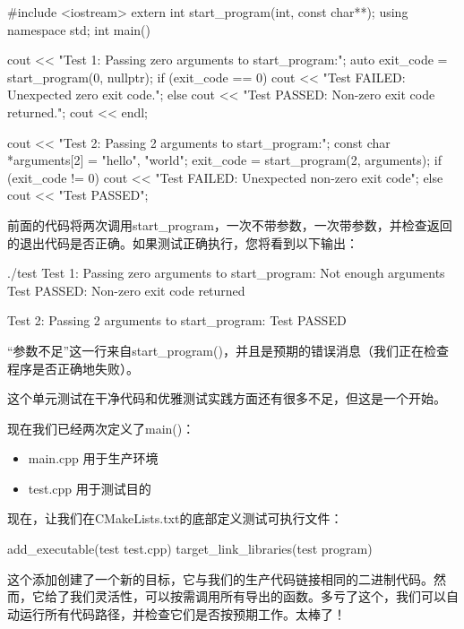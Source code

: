 
\begin{cpp}
#include <iostream>
extern int start_program(int, const char**);
using namespace std;
int main()
{
    cout << "Test 1: Passing zero arguments to start_program:\n";
    auto exit_code = start_program(0, nullptr);
    if (exit_code == 0)
        cout << "Test FAILED: Unexpected zero exit code.\n";
    else
        cout << "Test PASSED: Non-zero exit code returned.\n";
    cout << endl;

    cout << "Test 2: Passing 2 arguments to start_program:\n";
    const char *arguments[2] = {"hello", "world"};
    exit_code = start_program(2, arguments);
    if (exit_code != 0)
        cout << "Test FAILED: Unexpected non-zero exit code\n";
    else
        cout << "Test PASSED\n";
}
\end{cpp}

前面的代码将两次调用start\_program，一次不带参数，一次带参数，并检查返回的退出代码是否正确。如果测试正确执行，您将看到以下输出：

\begin{shell}
./test
Test 1: Passing zero arguments to start_program:
Not enough arguments
Test PASSED: Non-zero exit code returned

Test 2: Passing 2 arguments to start_program:
Test PASSED
\end{shell}

“参数不足”这一行来自start\_program()，并且是预期的错误消息（我们正在检查程序是否正确地失败）。

这个单元测试在干净代码和优雅测试实践方面还有很多不足，但这是一个开始。

现在我们已经两次定义了main()：

\begin{itemize}
\item
main.cpp 用于生产环境

\item
test.cpp 用于测试目的
\end{itemize}

现在，让我们在CMakeLists.txt的底部定义测试可执行文件：

\begin{cmake}
add_executable(test test.cpp)
target_link_libraries(test program)
\end{cmake}

这个添加创建了一个新的目标，它与我们的生产代码链接相同的二进制代码。然而，它给了我们灵活性，可以按需调用所有导出的函数。多亏了这个，我们可以自动运行所有代码路径，并检查它们是否按预期工作。太棒了！

















